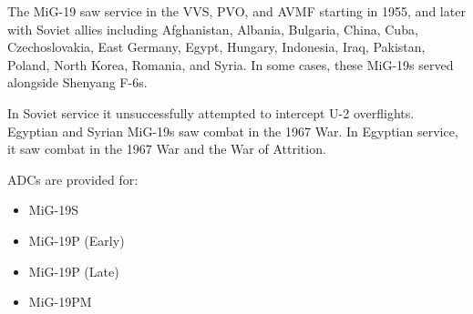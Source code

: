 The MiG-19 saw service in the VVS, PVO, and AVMF starting in 1955, and later with Soviet allies including Afghanistan, Albania, Bulgaria, China, Cuba, Czechoslovakia, East Germany, Egypt, Hungary, Indonesia, Iraq, Pakistan, Poland, North Korea, Romania, and Syria. In some cases, these MiG-19s served alongside Shenyang F-6s.

In Soviet service it unsuccessfully attempted to intercept U-2 overflights. Egyptian and Syrian MiG-19s saw combat in the 1967 War. In Egyptian service, it saw combat in the 1967 War and the War of Attrition.

ADCs are provided for:
\begin{itemize}
    \item MiG-19S
    \item MiG-19P (Early)
    \item MiG-19P (Late)
    \item MiG-19PM
\end{itemize}